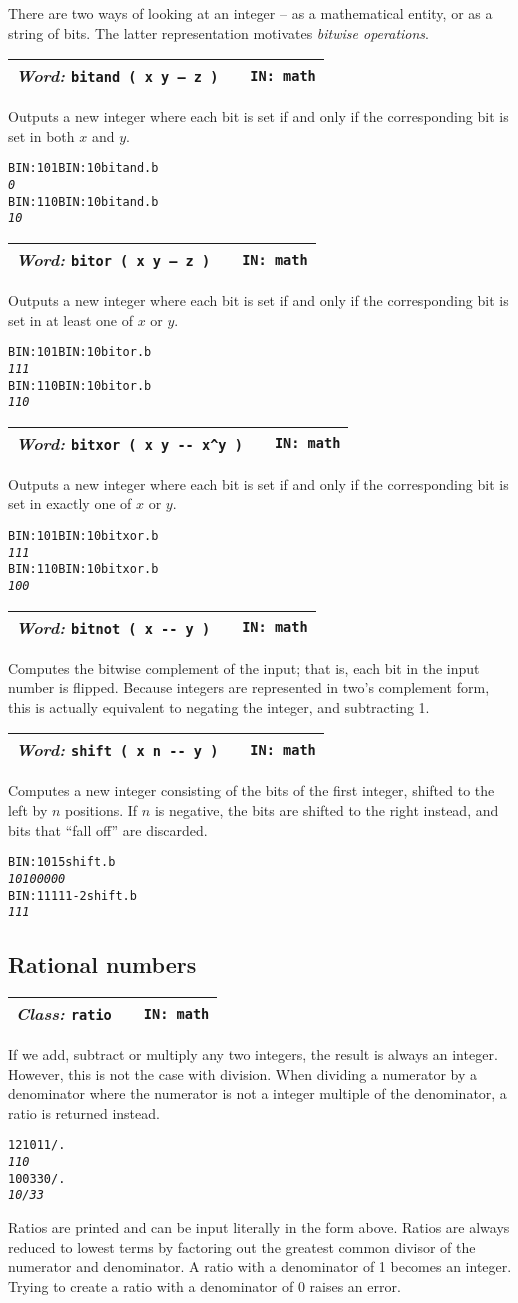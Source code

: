 \documentclass{report}
\newcommand{\ordinaryword}[3]{\index{#1}
\emph{Word:} \texttt{#2} &&\texttt{IN: #3}}
\newcommand{\classword}[2]{\index{#1}
\emph{Class:} \texttt{#1} &&\texttt{IN: #2}}
\newcommand{\wordtable}[1]{

\begin{tabularx}{12cm}[t]{lXr}
\hline
#1\\
\hline
\end{tabularx}

}
\begin{document}
There are two ways of looking at an integer -- as a mathematical entity, or as a string of bits. The latter representation motivates \emph{bitwise operations}.
\wordtable{
\ordinaryword{bitand}{bitand ( x y -- z )}{math}
}
Outputs a new integer where each bit is set if and only if the corresponding bit is set in both $x$ and $y$.
\begin{alltt}
BIN: 101 BIN: 10 bitand .b
\emph{0}
BIN: 110 BIN: 10 bitand .b
\emph{10}
\end{alltt}
\wordtable{
\ordinaryword{bitor}{bitor ( x y -- z )}{math}
}
Outputs a new integer where each bit is set if and only if the corresponding bit is set in at least one of $x$ or $y$.
\begin{alltt}
BIN: 101 BIN: 10 bitor .b
\emph{111}
BIN: 110 BIN: 10 bitor .b
\emph{110}
\end{alltt}
\wordtable{
\ordinaryword{bitxor}{bitxor ( x y -{}- x\^{}y )}{math}
}
Outputs a new integer where each bit is set if and only if the corresponding bit is set in exactly one of $x$ or $y$.
\begin{alltt}
BIN: 101 BIN: 10 bitxor .b
\emph{111}
BIN: 110 BIN: 10 bitxor .b
\emph{100}
\end{alltt}
\wordtable{
\ordinaryword{bitnot}{bitnot ( x -{}- y )}{math}
}
Computes the bitwise complement of the input; that is, each bit in the input number is flipped. Because integers are represented in two's complement form, this is actually equivalent to negating the integer, and subtracting 1.
\wordtable{
\ordinaryword{shift}{shift ( x n -{}- y )}{math}
}
Computes a new integer consisting of the bits of the first integer, shifted to the left by $n$ positions. If $n$ is negative, the bits are shifted to the right instead, and bits that ``fall off'' are discarded.
\begin{alltt}
BIN: 101 5 shift .b
\emph{10100000}
BIN: 11111 -2 shift .b
\emph{111}
\end{alltt}

\subsection{\label{ratios}Rational numbers}

\newcommand{\rationalglos}{}
\rationalglos
\ratioglos

\wordtable{
\classword{ratio}{math}
}
If we add, subtract or multiply any two integers, the result is always an integer. However, this is not the case with division. When dividing a numerator by a denominator where the numerator is not a integer multiple of the denominator, a ratio is returned instead.
\begin{alltt}
1210 11 / .
\emph{110}
100 330 / .
\emph{10/33}
\end{alltt}
Ratios are printed and can be input literally in the form above. Ratios are always reduced to lowest terms by factoring out the greatest common divisor of the numerator and denominator. A ratio with a denominator of 1 becomes an integer. Trying to create a ratio with a denominator of 0 raises an error.
\end{document}
